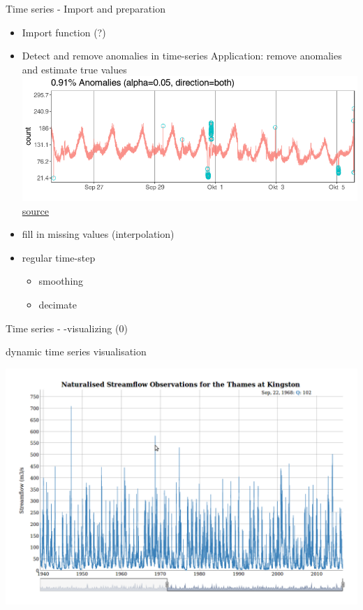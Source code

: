 \documentclass[8pt,ignorenonframetext,]{beamer}
\providecommand{\tightlist}{%
  \setlength{\itemsep}{0pt}\setlength{\parskip}{0pt}}
\begin{document}
\begin{frame}{Time series - Import and preparation}

\begin{itemize}
\tightlist
\item
  Import function (?)
\item
  Detect and remove anomalies in time-series Application: remove
  anomalies and estimate true values
  \includegraphics{imgPres/TS_anomalydetection.png}
  \href{https://github.com/twitter/AnomalyDetection}{source}
\item
  fill in missing values (interpolation)
\item
  regular time-step

  \begin{itemize}
  \tightlist
  \item
    smoothing
  \item
    decimate
  \end{itemize}
\end{itemize}

\end{frame}

\begin{frame}{Time series - -visualizing (0)}

dynamic time series visualisation

\includegraphics{imgPres/dygraph.png}

\end{frame}
\end{document}

